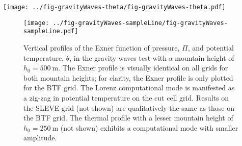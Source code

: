 \documentclass{ametsoc}
\begin{document}
\begin{figure*}
	\centering
	\texttt{[image: ../fig-gravityWaves-theta/fig-gravityWaves-theta.pdf]}
%
	\caption{Anomalies in potential temperature in the gravity waves test after 5 hours with a mountain height, \(h_0 = \SI{250}{\meter}\).  The central domain in the lowest \SI{12}{\kilo\meter} is shown on (a) the BTF grid, and (c) the cut cell grid.  The four lowest layers of each grid are shown for (b) BTF, and (d) cut cell grids, using a narrower potential temperature scale.  The results on the SLEVE grid (not shown) are qualitatively identical to results on the BTF grid.  Axes are in units of \si{\meter}.}
	\label{fig:gw-theta}
\end{figure*}

\begin{figure}
	\centering
	\texttt{[image: ../fig-gravityWaves-sampleLine/fig-gravityWaves-sampleLine.pdf]}
%
	\caption{Vertical profiles of the Exner function of pressure, \(\Pi\), and potential temperature, \(\theta\), in the gravity waves test with a mountain height of \(h_0 = \SI{500}{\meter}\).  The Exner profile is visually identical on all grids for both mountain heights; for clarity, the Exner profile is only plotted for the BTF grid.  The Lorenz computational mode is manifested as a zig-zag in potential temperature on the cut cell grid.   Results on the SLEVE grid (not shown) are qualitatively the same as those on the BTF grid.  The thermal profile with a lesser mountain height of \(h_0 = \SI{250}{\meter}\) (not shown) exhibits a computational mode with smaller amplitude.}
	\label{fig:gw-exner-theta}
\end{figure}
\end{document}
